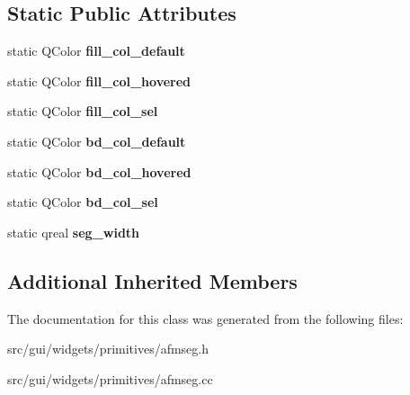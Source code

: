 \subsection*{Static Public Attributes}
\begin{DoxyCompactItemize}
\item 
static Q\+Color {\bfseries fill\+\_\+col\+\_\+default}\hypertarget{classprim_1_1AFMSeg_a529b4b89a0ecfaa7d99ef7ed30ebee3c}{}\label{classprim_1_1AFMSeg_a529b4b89a0ecfaa7d99ef7ed30ebee3c}

\item 
static Q\+Color {\bfseries fill\+\_\+col\+\_\+hovered}\hypertarget{classprim_1_1AFMSeg_a348b6295b36b2e6626505c46ec277e2c}{}\label{classprim_1_1AFMSeg_a348b6295b36b2e6626505c46ec277e2c}

\item 
static Q\+Color {\bfseries fill\+\_\+col\+\_\+sel}\hypertarget{classprim_1_1AFMSeg_a8073a24bbdee2d9e31e34b29bc90b623}{}\label{classprim_1_1AFMSeg_a8073a24bbdee2d9e31e34b29bc90b623}

\item 
static Q\+Color {\bfseries bd\+\_\+col\+\_\+default}\hypertarget{classprim_1_1AFMSeg_a6af68fe96d65adb4f0729f4c6c25d182}{}\label{classprim_1_1AFMSeg_a6af68fe96d65adb4f0729f4c6c25d182}

\item 
static Q\+Color {\bfseries bd\+\_\+col\+\_\+hovered}\hypertarget{classprim_1_1AFMSeg_a230b904e2e45841c5ca3e138fd1d03c2}{}\label{classprim_1_1AFMSeg_a230b904e2e45841c5ca3e138fd1d03c2}

\item 
static Q\+Color {\bfseries bd\+\_\+col\+\_\+sel}\hypertarget{classprim_1_1AFMSeg_a03f6c617891b95b7481bc71f9f7a1671}{}\label{classprim_1_1AFMSeg_a03f6c617891b95b7481bc71f9f7a1671}

\item 
static qreal {\bfseries seg\+\_\+width}\hypertarget{classprim_1_1AFMSeg_aef0aacdc7deac964396aa9d2cd65cbb6}{}\label{classprim_1_1AFMSeg_aef0aacdc7deac964396aa9d2cd65cbb6}

\end{DoxyCompactItemize}
\subsection*{Additional Inherited Members}


The documentation for this class was generated from the following files\+:\begin{DoxyCompactItemize}
\item 
src/gui/widgets/primitives/afmseg.\+h\item 
src/gui/widgets/primitives/afmseg.\+cc\end{DoxyCompactItemize}
